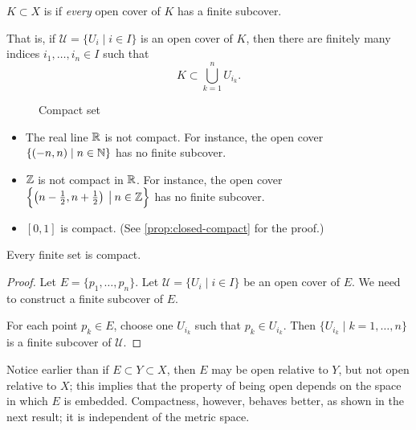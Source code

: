 \begin{definition}[Compactness]
$K\subset X$ is  if \emph{every} open cover of $K$ has a finite subcover.
\end{definition}

That is, if $\mathcal{U}=\{U_i\mid i\in I\}$ is an open cover of $K$, then there are finitely many indices $i_1,\dots,i_n\in I$ such that
\[K\subset\bigcup_{k=1}^{n}U_{i_k}.\]

\begin{figure}[H]
\centering
{}
\caption{Compact set}
\end{figure}

\begin{example}
\begin{itemize}
\item The real line $\mathbb R$ is not compact. For instance, the open cover $\{(-n,n)\mid n\in\mathbb N\}$ has no finite subcover.
\item $\mathbb Z$ is not compact in $\mathbb R$. For instance, the open cover $\left\{\left(n-\frac{1}{2},n+\frac{1}{2}\right)\:\big|\:n\in\mathbb Z\right\}$ has no finite subcover.
\item $[0,1]$ is compact. (See \cref{prop:closed-compact} for the proof.)
\end{itemize}
\end{example}

\begin{proposition}
Every finite set is compact.
\end{proposition}

\begin{proof}
Let $E=\{p_1,\dots,p_n\}$. Let $\mathcal{U}=\{U_i\mid i\in I\}$ be an open cover of $E$. We need to construct a finite subcover of $E$.

For each point $p_k\in E$, choose one $U_{i_k}$ such that $p_k\in U_{i_k}$. Then $\{U_{i_k}\mid k=1,\dots,n\}$ is a finite subcover of $\mathcal{U}$.
\end{proof}

Notice earlier than if $E\subset Y\subset X$, then $E$ may be open relative to $Y$, but not open relative to $X$; this implies that the property of being open depends on the space in which $E$ is embedded. Compactness, however, behaves better, as shown in the next result; it is independent of the metric space.

